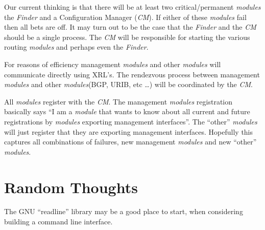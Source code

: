 \documentclass[11pt]{article}
\makeatletter
\newcommand{\module} {{\em module}\@\xspace}
\newcommand{\modules} {{\em modules}\@\xspace}
\newcommand{\finder} {{\em Finder}\@\xspace}
\newcommand{\cm} {{\em CM}\@\xspace}
\makeatother
\begin{document}
Our current thinking is that there will be at least two
critical/permanent \modules the \finder and a Configuration Manager
(\cm). If either of these \modules fail then all bets are off. It may
turn out to be the case that the \finder and the \cm should be a
single process. The \cm will be responsible for starting the various
routing \modules and perhaps even the \finder.

For reasons of efficiency management \modules and other \modules will
communicate directly using XRL's. The rendezvous process between
management \modules and other \modules (BGP, URIB, etc \ldots) will be
coordinated by the \cm.

All \modules register with the \cm. The management \modules
registration basically says ``I am a \module that wants to know about
all current and future registrations by \modules exporting management
interfaces''. The ``other'' \modules will just register that they are
exporting management interfaces. Hopefully this captures all
combinations of failures, new management \modules and new ``other''
\modules.

\section{Random Thoughts}
The GNU ``readline'' library may be a good place to start, when
considering building a command line interface.



\end{document}
